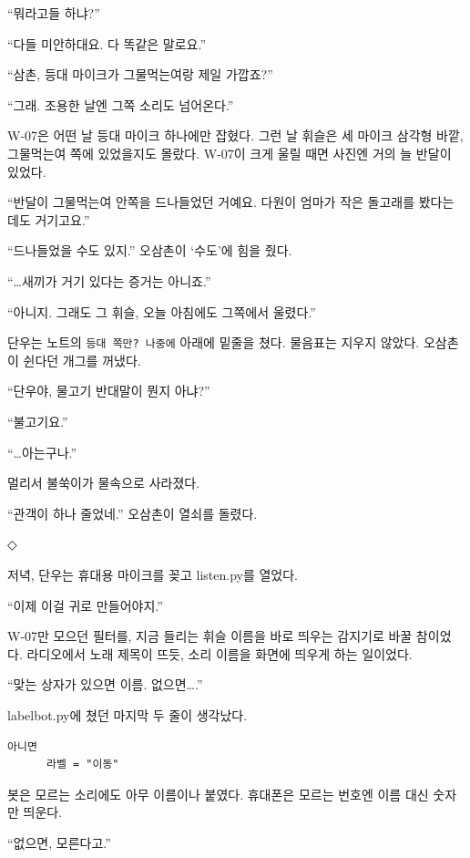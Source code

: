 \documentclass[
  korean,
  letterpaper,
  twoside,
  open=any,
  fontsize=12.5pt,
  headings=small]{scrbook}
\newcommand{\logfont}{\linespread{1}\fontsize{10.8}{15.2}\selectfont}
\begin{document}
``뭐라고들 하냐?''

``다들 미안하대요. 다 똑같은
말로요.''

``삼촌, 등대 마이크가
그물먹는여랑 제일 가깝죠?''

``그래. 조용한 날엔 그쪽
소리도 넘어온다.''

W-07은 어떤 날 등대 마이크
하나에만 잡혔다. 그런 날
휘슬은 세 마이크 삼각형 바깥,
그물먹는여 쪽에 있었을지도
몰랐다. W-07이 크게 울릴 때면
사진엔 거의 늘 반달이 있었다.

``반달이 그물먹는여 안쪽을
드나들었던 거예요. 다원이
엄마가 작은 돌고래를 봤다는
데도 거기고요.''

``드나들었을 수도 있지.''
오삼촌이 `수도'에 힘을 줬다.

``\ldots 새끼가 거기 있다는
증거는 아니죠.''

``아니지. 그래도 그 휘슬, 오늘
아침에도 그쪽에서 울렸다.''

단우는 노트의
\texttt{등대\ 쪽만?\ 나중에}
아래에 밑줄을 쳤다. 물음표는
지우지 않았다. 오삼촌이 쉰다던
개그를 꺼냈다.

``단우야, 물고기 반대말이 뭔지
아냐?''

``불고기요.''

``\ldots 아는구나.''

멀리서 불쑥이가 물속으로
사라졌다.

``관객이 하나 줄었네.''
오삼촌이 열쇠를 돌렸다.

\begin{center}◇\end{center}\nopagebreak

저녁, 단우는 휴대용 마이크를
꽂고 listen.py를 열었다.

``이제 이걸 귀로 만들어야지.''

W-07만 모으던 필터를, 지금
들리는 휘슬 이름을 바로 띄우는
감지기로 바꿀 참이었다.
라디오에서 노래 제목이 뜨듯,
소리 이름을 화면에 띄우게 하는
일이었다.

``맞는 상자가 있으면 이름.
없으면\ldots.''

labelbot.py에 쳤던 마지막 두
줄이 생각났다.

\begin{Verbatim}[samepage=true,frame=single,framesep=2.5mm,rulecolor=\color{gray},formatcom=\logfont]
아니면
      라벨 = "이동"
\end{Verbatim}

봇은 모르는 소리에도 아무
이름이나 붙였다. 휴대폰은
모르는 번호엔 이름 대신 숫자만
띄운다.

``없으면, 모른다고.''
\end{document}
